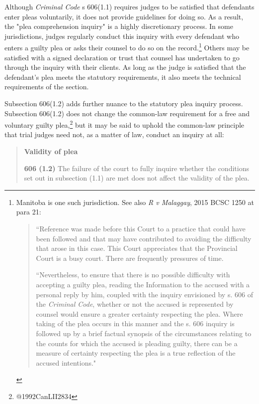 Although \textit{Criminal Code} s 606(1.1) requires judges to be satisfied that defendants enter pleas voluntarily, it does not provide guidelines for doing so. As a result, the "plea comprehension inquiry" is a highly discretionary process. In some jurisdictions, judges regularly conduct this inquiry with every defendant who enters a guilty plea or asks their counsel to do so on the record.\footnote{Manitoba is one such jurisdiction. See also \textit{R v Malaggay}, 2015 BCSC 1250 at para 21: 

\begin{quote}
    ``Reference was made before this Court to a practice that could have been followed and that may have contributed to avoiding the difficulty that arose in this case. This Court appreciates that the Provincial Court is a busy court. There are frequently pressures of time.
    
    ``Nevertheless, to ensure that there is no possible difficulty with accepting a guilty plea, reading the Information to the accused with a personal reply by him, coupled with the inquiry envisioned by s. 606 of the \textit{Criminal Code}, whether or not the accused is represented by counsel would ensure a greater certainty respecting the plea. Where taking of the plea occurs in this manner and the s. 606 inquiry is followed up by a brief factual synopsis of the circumstances relating to the counts for which the accused is pleading guilty, there can be a measure of certainty respecting the plea is a true reflection of the accused intentions."
    
\end{quote}} Others may be satisfied with a signed declaration or trust that counsel has undertaken to go through the inquiry with their clients. As long as the judge is satisfied that the defendant's plea meets the statutory requirements, it also meets the technical requirements of the section.

Subsection 606(1.2) adds further nuance to the statutory plea inquiry process. Subsection 606(1.2) does not change the common-law requirement for a free and voluntary guilty plea,\footnote{@1992CanLII2834} but it may be said to uphold the common-law principle that trial judges need not, as a matter of law, conduct an inquiry at all:

\begin{quote}
    \onehalfspacing
    \textbf{Validity of plea}
    
    \textbf{606 (1.2)} The failure of the court to fully inquire whether the conditions set out in subsection (1.1) are met does not affect the validity of the plea.
\end{quote}

